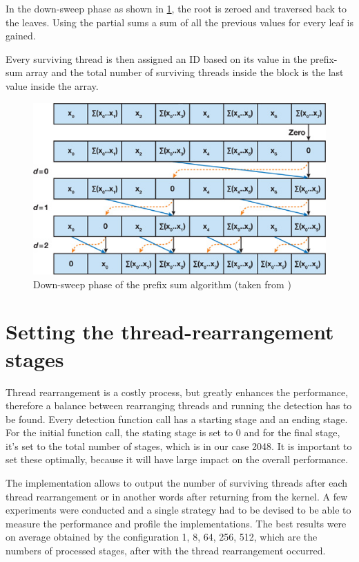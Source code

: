 In the down-sweep phase as shown in \ref{fig:sweepdown}, the root is zeroed and traversed back to the leaves. Using the partial sums a sum of all the previous values for every leaf is gained.

Every surviving thread is then assigned an ID based on its value in the prefix-sum array and the total number of surviving threads inside the block is the last value inside the array.

\begin{center}
\begin{figure}[h]
	\centering\includegraphics[width=0.6\linewidth]{fig/sweepdown.jpg}
	\caption{Down-sweep phase of the prefix sum algorithm (taken from \cite{gems-prefixsum})}
	\label{fig:sweepdown}
\end{figure}
\end{center}

\section{Setting the thread-rearrangement stages}

Thread rearrangement is a costly process, but greatly enhances the performance, therefore a balance between rearranging threads and running the detection has to be found. Every detection function call has a starting stage and an ending stage. For the initial function call, the stating stage is set to 0 and for the final stage, it's set to the total number of stages, which is in our case 2048. It is important to set these optimally, because it will have large impact on the overall performance.

The implementation allows to output the number of surviving threads after each thread rearrangement or in another words after returning from the kernel. A few experiments were conducted and a single strategy had to be devised to be able to measure the performance and profile the implementations. The best results were on average obtained by the configuration 1, 8, 64, 256, 512, which are the numbers of processed stages, after with the thread rearrangement occurred.


